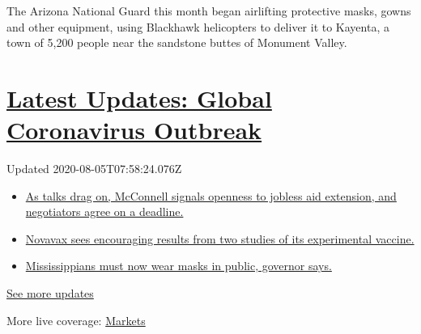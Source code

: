 The Arizona National Guard this month began airlifting protective masks,
gowns and other equipment, using Blackhawk helicopters to deliver it to
Kayenta, a town of 5,200 people near the sandstone buttes of Monument
Valley.

\hypertarget{latest-updates-global-coronavirus-outbreak}{%
\section{\texorpdfstring{\href{https://www.nytimes3xbfgragh.onion/2020/08/04/world/coronavirus-cases.html?action=click\&pgtype=Article\&state=default\&region=MAIN_CONTENT_1\&context=storylines_live_updates}{Latest
Updates: Global Coronavirus
Outbreak}}{Latest Updates: Global Coronavirus Outbreak}}\label{latest-updates-global-coronavirus-outbreak}}

Updated 2020-08-05T07:58:24.076Z

\begin{itemize}
\tightlist
\item
  \href{https://www.nytimes3xbfgragh.onion/2020/08/04/world/coronavirus-cases.html?action=click\&pgtype=Article\&state=default\&region=MAIN_CONTENT_1\&context=storylines_live_updates\#link-762df92}{As
  talks drag on, McConnell signals openness to jobless aid extension,
  and negotiators agree on a deadline.}
\item
  \href{https://www.nytimes3xbfgragh.onion/2020/08/04/world/coronavirus-cases.html?action=click\&pgtype=Article\&state=default\&region=MAIN_CONTENT_1\&context=storylines_live_updates\#link-1228a480}{Novavax
  sees encouraging results from two studies of its experimental
  vaccine.}
\item
  \href{https://www.nytimes3xbfgragh.onion/2020/08/04/world/coronavirus-cases.html?action=click\&pgtype=Article\&state=default\&region=MAIN_CONTENT_1\&context=storylines_live_updates\#link-794484ed}{Mississippians
  must now wear masks in public, governor says.}
\end{itemize}

\href{https://www.nytimes3xbfgragh.onion/2020/08/04/world/coronavirus-cases.html?action=click\&pgtype=Article\&state=default\&region=MAIN_CONTENT_1\&context=storylines_live_updates}{See
more updates}

More live coverage:
\href{https://www.nytimes3xbfgragh.onion/live/2020/08/04/business/stock-market-today-coronavirus?action=click\&pgtype=Article\&state=default\&region=MAIN_CONTENT_1\&context=storylines_live_updates}{Markets}

